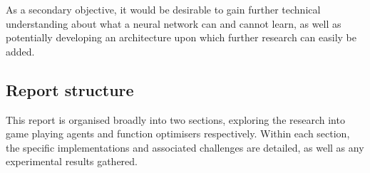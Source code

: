 As a secondary objective, it would be desirable to gain further technical understanding about what a neural network can and cannot learn, as well as potentially developing an architecture upon which further research can easily be added.

\subsection{Report structure}
This report is organised broadly into two sections, exploring the research into game playing agents and function optimisers respectively. Within each section, the specific implementations and associated challenges are detailed, as well as any experimental results gathered.
